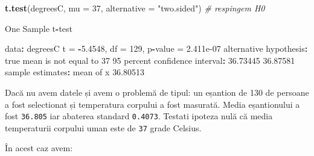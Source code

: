\documentclass[]{article}
\newenvironment{Shaded}{\begin{snugshade}}{\end{snugshade}}
\newcommand{\KeywordTok}[1]{\textcolor[rgb]{0.13,0.29,0.53}{\textbf{#1}}}
\newcommand{\DataTypeTok}[1]{\textcolor[rgb]{0.13,0.29,0.53}{#1}}
\newcommand{\DecValTok}[1]{\textcolor[rgb]{0.00,0.00,0.81}{#1}}
\newcommand{\FloatTok}[1]{\textcolor[rgb]{0.00,0.00,0.81}{#1}}
\newcommand{\StringTok}[1]{\textcolor[rgb]{0.31,0.60,0.02}{#1}}
\newcommand{\CommentTok}[1]{\textcolor[rgb]{0.56,0.35,0.01}{\textit{#1}}}
\newcommand{\OperatorTok}[1]{\textcolor[rgb]{0.81,0.36,0.00}{\textbf{#1}}}
\newcommand{\NormalTok}[1]{#1}
\begin{document}
\begin{Shaded}
\begin{Highlighting}[]
\KeywordTok{t.test}\NormalTok{(degreesC, }\DataTypeTok{mu =} \DecValTok{37}\NormalTok{, }\DataTypeTok{alternative =} \StringTok{"two.sided"}\NormalTok{) }\CommentTok{# respingem H0}

\NormalTok{    One Sample t}\OperatorTok{-}\NormalTok{test}

\NormalTok{data}\OperatorTok{:}\StringTok{  }\NormalTok{degreesC}
\NormalTok{t =}\StringTok{ }\OperatorTok{-}\FloatTok{5.4548}\NormalTok{, df =}\StringTok{ }\DecValTok{129}\NormalTok{, p}\OperatorTok{-}\NormalTok{value =}\StringTok{ }\FloatTok{2.411e-07}
\NormalTok{alternative hypothesis}\OperatorTok{:}\StringTok{ }\NormalTok{true mean is not equal to }\DecValTok{37}
\DecValTok{95}\NormalTok{ percent confidence interval}\OperatorTok{:}
\StringTok{ }\FloatTok{36.73445} \FloatTok{36.87581}
\NormalTok{sample estimates}\OperatorTok{:}
\NormalTok{mean of x }
 \FloatTok{36.80513} 
\end{Highlighting}
\end{Shaded}

\begin{Shaded}
\end{Shaded}

Dacă nu avem datele și avem o problemă de tipul: un eșantion de 130 de
persoane a fost selectionat și temperatura corpului a fost masurată.
Media eșantionului a fost \texttt{36.805} iar abaterea standard
\texttt{0.4073}. Testati ipoteza nulă că media temperaturii corpului
uman este de \texttt{37} grade Celsius.

În acest caz avem:
\end{document}
